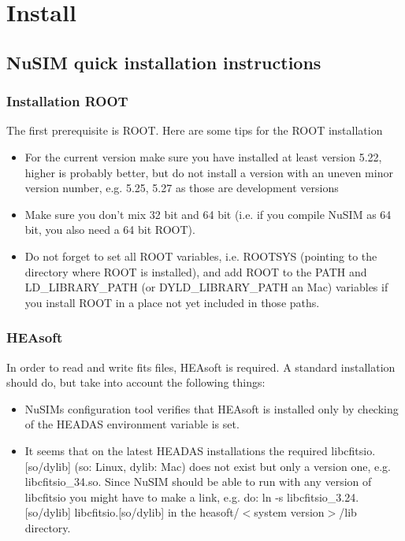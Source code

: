 \chapter{Install}

\section{NuSIM quick installation instructions}
\subsection{Installation ROOT}

The first prerequisite is ROOT. Here are some tips for the ROOT installation
\begin{itemize}
\item For the current version make sure you have installed at least version 5.22, higher is probably  better, but do not install a version with an uneven minor version number, e.g. 5.25, 5.27 as those are development versions
\item Make sure you don't mix 32 bit and 64 bit (i.e. if you compile NuSIM as 64 bit, you also need a 64 bit ROOT).
\item Do not forget to set all ROOT variables, i.e. ROOTSYS (pointing to the directory where ROOT is installed), and add ROOT to the PATH and LD\_LIBRARY\_PATH (or DYLD\_LIBRARY\_PATH an Mac) variables if you install ROOT in a place not yet included in those paths. 
\end{itemize}

\subsection{HEAsoft}
In order to read and write fits files, HEAsoft is required. A standard installation should do, but take into account the following things:
\begin{itemize}
\item	NuSIMs configuration tool verifies that HEAsoft is installed only by checking of the HEADAS environment variable is set.
\item	It seems that on the latest HEADAS installations the required libcfitsio.[so/dylib] (so: Linux, dylib: Mac) does not exist but 
only a version one, e.g. libcfitsio\_34.so. Since NuSIM should be able to run with any version of libcfitsio you might have to make a link, e.g. do:
ln -s libcfitsio\_3.24.[so/dylib] libcfitsio.[so/dylib]
in the heasoft/$<$system version$>$/lib directory.
\end{itemize}

